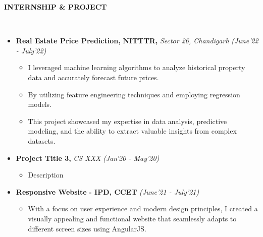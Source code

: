 \documentclass[a4paper,10pt]{article}
\newcommand{\resheading}[1]{{\small \colorbox{mygrey}{\begin{minipage}{0.99\textwidth}{\textbf{#1 \vphantom{p\^{E}}}}\end{minipage}}}}
\begin{document}
\noindent
\resheading{\textbf{INTERNSHIP \& PROJECT}}\\[-0.3cm]
\begin{itemize}
    \item \textbf{Real Estate Price Prediction,} \textbf{NITTTR,} \textit{ Sector 26, Chandigarh} \hfill \textit{(June'22 - July'22)}
    \begin{itemize}
        \item I leveraged machine learning algorithms to analyze historical property data and accurately forecast future prices.
        \item By utilizing feature engineering techniques and employing regression models.
        \item This project showcased my expertise in data analysis, predictive modeling, and the ability to extract valuable insights from complex datasets.
    \end{itemize}
        \item \textbf{Project Title 3,} \textit{CS XXX} \hfill \textit{(Jan'20 - May'20)}
    \begin{itemize}
        \item Description
    \end{itemize}
        \item \textbf{Responsive Website} \textbf{ - IPD, CCET}  \hfill \textit{(June'21 - July'21)}
    \begin{itemize}
        \item With a focus on user experience and modern design principles, I created a visually appealing and functional website that seamlessly adapts to different screen sizes using AngularJS.
    \end{itemize}
\end{itemize}
\end{document}
